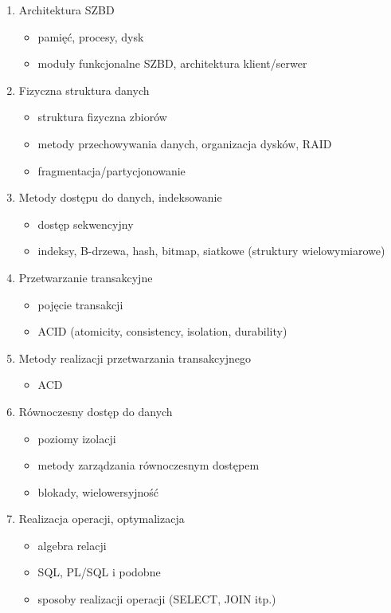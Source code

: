 \documentclass[12pt]{article}
\begin{document}
\begin{enumerate}
\item Architektura SZBD
\begin{itemize}
\item pamięć, procesy, dysk
\item moduły funkcjonalne SZBD, architektura klient/serwer
\end{itemize}
\item Fizyczna struktura danych
\begin{itemize}
\item struktura fizyczna zbiorów
\item metody przechowywania danych, organizacja dysków, RAID
\item fragmentacja/partycjonowanie
\end{itemize}
\item Metody dostępu do danych, indeksowanie
\begin{itemize}
\item dostęp sekwencyjny
\item indeksy, B-drzewa, hash, bitmap, siatkowe (struktury wielowymiarowe)
\end{itemize}
\item Przetwarzanie transakcyjne
\begin{itemize}
\item pojęcie transakcji
\item ACID (atomicity, consistency, isolation, durability)
\end{itemize}
\item Metody realizacji przetwarzania transakcyjnego
\begin{itemize}
\item ACD
\end{itemize}
\item Równoczesny dostęp do danych
\begin{itemize}
\item poziomy izolacji
\item metody zarządzania równoczesnym dostępem
\item blokady, wielowersyjność
\end{itemize}
\item Realizacja operacji, optymalizacja
\begin{itemize}
\item algebra relacji
\item SQL, PL/SQL i podobne
\item sposoby realizacji operacji (SELECT, JOIN itp.)
\end{itemize}

\end{enumerate}
\end{document}
